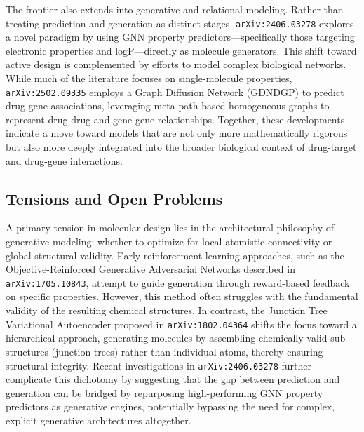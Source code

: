 \documentclass[11pt]{article}
\begin{document}
The frontier also extends into generative and relational modeling. Rather than treating prediction and generation as distinct stages, \texttt{arXiv:2406.03278} explores a novel paradigm by using GNN property predictors—specifically those targeting electronic properties and logP—directly as molecule generators. This shift toward active design is complemented by efforts to model complex biological networks. While much of the literature focuses on single-molecule properties, \texttt{arXiv:2502.09335} employs a Graph Diffusion Network (GDNDGP) to predict drug-gene associations, leveraging meta-path-based homogeneous graphs to represent drug-drug and gene-gene relationships. Together, these developments indicate a move toward models that are not only more mathematically rigorous but also more deeply integrated into the broader biological context of drug-target and drug-gene interactions.

\subsection{Tensions and Open Problems}

A primary tension in molecular design lies in the architectural philosophy of generative modeling: whether to optimize for local atomistic connectivity or global structural validity. Early reinforcement learning approaches, such as the Objective-Reinforced Generative Adversarial Networks described in \texttt{arXiv:1705.10843}, attempt to guide generation through reward-based feedback on specific properties. However, this method often struggles with the fundamental validity of the resulting chemical structures. In contrast, the Junction Tree Variational Autoencoder proposed in \texttt{arXiv:1802.04364} shifts the focus toward a hierarchical approach, generating molecules by assembling chemically valid sub-structures (junction trees) rather than individual atoms, thereby ensuring structural integrity. Recent investigations in \texttt{arXiv:2406.03278} further complicate this dichotomy by suggesting that the gap between prediction and generation can be bridged by repurposing high-performing GNN property predictors as generative engines, potentially bypassing the need for complex, explicit generative architectures altogether.
\end{document}
